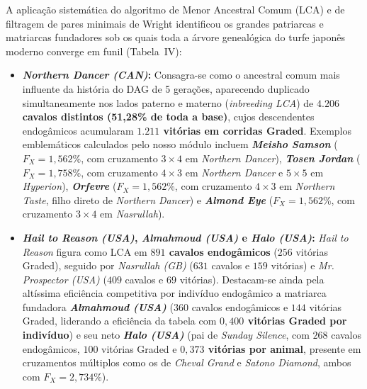 \documentclass[conference]{IEEEtran}
\begin{document}
A aplicação sistemática do algoritmo de Menor Ancestral Comum (LCA) e de filtragem de pares minimais de Wright identificou os grandes patriarcas e matriarcas fundadores sob os quais toda a árvore genealógica do turfe japonês moderno converge em funil (Tabela~IV):
\begin{itemize}
    \item \textbf{\textit{Northern Dancer (CAN)}:} Consagra-se como o ancestral comum mais influente da história do DAG de 5 gerações, aparecendo duplicado simultaneamente nos lados paterno e materno (\textit{inbreeding LCA}) de \textbf{$4.206$ cavalos distintos (51,28\%
de toda a base)}, cujos descendentes endogâmicos acumularam \textbf{$1.211$ vitórias em corridas Graded}. Exemplos emblemáticos calculados pelo nosso módulo  incluem \textbf{\textit{Meisho Samson}} ($F_X = 1,562$\%,
com cruzamento $3 \times 4$ em \textit{Northern Dancer}), \textbf{\textit{Tosen Jordan}} ($F_X = 1,758$\%,
com cruzamento $4 \times 3$ em \textit{Northern Dancer} e $5 \times 5$ em \textit{Hyperion}), \textbf{\textit{Orfevre}} ($F_X = 1,562$\%,
com cruzamento $4 \times 3$ em \textit{Northern Taste}, filho direto de \textit{Northern Dancer}) e \textbf{\textit{Almond Eye}} ($F_X = 1,562$\%,
com cruzamento $3 \times 4$ em \textit{Nasrullah}).
    \item \textbf{\textit{Hail to Reason (USA)}, \textit{Almahmoud (USA)} e \textit{Halo (USA)}:} \textit{Hail to Reason} figura como LCA em \textbf{$891$ cavalos endogâmicos} ($256$ vitórias Graded), seguido por \textit{Nasrullah (GB)} ($631$ cavalos e $159$ vitórias) e \textit{Mr. Prospector (USA)} ($409$ cavalos e $69$ vitórias). Destacam-se ainda pela altíssima eficiência competitiva por indivíduo endogâmico a matriarca fundadora \textbf{\textit{Almahmoud (USA)}} ($360$ cavalos endogâmicos e $144$ vitórias Graded, liderando a eficiência da tabela com \textbf{$0,400$ vitórias Graded por indivíduo}) e seu neto \textbf{\textit{Halo (USA)}} (pai de \textit{Sunday Silence}, com $268$ cavalos endogâmicos, $100$ vitórias Graded e \textbf{$0,373$ vitórias por animal}, presente em cruzamentos múltiplos como os de \textit{Cheval Grand} e \textit{Satono Diamond}, ambos com $F_X = 2,734$\%).
\end{itemize}
\end{document}
